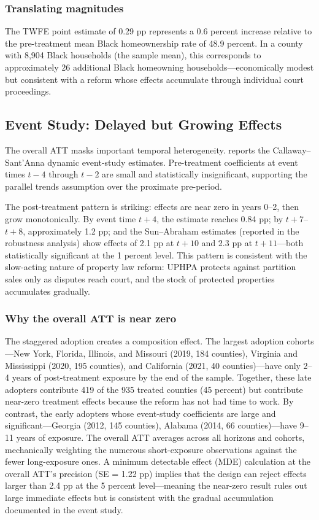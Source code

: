 \documentclass[12pt]{article}
\begin{document}
\subsubsection*{Translating magnitudes} The TWFE point estimate of 0.29 pp represents a 0.6 percent increase relative to the pre-treatment mean Black homeownership rate of 48.9 percent. In a county with 8,904 Black households (the sample mean), this corresponds to approximately 26 additional Black homeowning households---economically modest but consistent with a reform whose effects accumulate through individual court proceedings.

\subsection{Event Study: Delayed but Growing Effects}



The overall ATT masks important temporal heterogeneity.  reports the Callaway--Sant'Anna dynamic event-study estimates. Pre-treatment coefficients at event times $t-4$ through $t-2$ are small and statistically insignificant, supporting the parallel trends assumption over the proximate pre-period.

The post-treatment pattern is striking: effects are near zero in years 0--2, then grow monotonically. By event time $t+4$, the estimate reaches 0.84 pp; by $t+7$--$t+8$, approximately 1.2 pp; and the Sun--Abraham estimates (reported in the robustness analysis) show effects of 2.1 pp at $t+10$ and 2.3 pp at $t+11$---both statistically significant at the 1 percent level. This pattern is consistent with the slow-acting nature of property law reform: UPHPA protects against partition sales only as disputes reach court, and the stock of protected properties accumulates gradually.

\subsubsection*{Why the overall ATT is near zero} The staggered adoption creates a composition effect. The largest adoption cohorts---New York, Florida, Illinois, and Missouri (2019, 184 counties), Virginia and Mississippi (2020, 195 counties), and California (2021, 40 counties)---have only 2--4 years of post-treatment exposure by the end of the sample. Together, these late adopters contribute 419 of the 935 treated counties (45 percent) but contribute near-zero treatment effects because the reform has not had time to work. By contrast, the early adopters whose event-study coefficients are large and significant---Georgia (2012, 145 counties), Alabama (2014, 66 counties)---have 9--11 years of exposure. The overall ATT averages across all horizons and cohorts, mechanically weighting the numerous short-exposure observations against the fewer long-exposure ones. A minimum detectable effect (MDE) calculation at the overall ATT's precision (SE = 1.22 pp) implies that the design can reject effects larger than 2.4 pp at the 5 percent level---meaning the near-zero result rules out large immediate effects but is consistent with the gradual accumulation documented in the event study.
\end{document}
